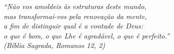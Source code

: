 \begin{epigrafe}
    \vspace*{\fill}
	\begin{flushright}
		\textit{``Não vos amoldeis às estruturas deste mundo, \\
		mas transformai-vos pela renovação da mente, \\
		a fim de distinguir qual é a vontade de Deus: \\
		o que é bom, o que Lhe é agradável, o que é perfeito.”\\
		(Bíblia Sagrada, Romanos 12, 2)}
	\end{flushright}
\end{epigrafe}